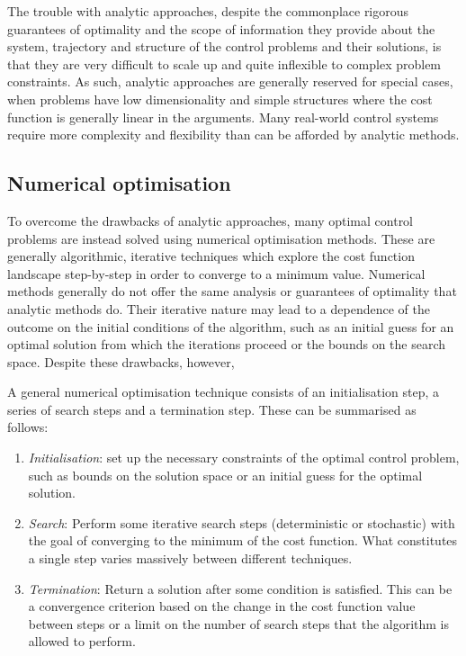 The trouble with analytic approaches, despite the commonplace rigorous guarantees of optimality and the scope of information they provide about the system, trajectory and structure of the control problems and their solutions, is that they are very difficult to scale up and quite inflexible to complex problem constraints. As such, analytic approaches are generally reserved for special cases, when problems have low dimensionality and simple structures where the cost function is generally linear in the arguments. Many real-world control systems require more complexity and flexibility than can be afforded by analytic methods.

\subsection{Numerical optimisation} 

To overcome the drawbacks of analytic approaches, many optimal control problems are instead solved using numerical optimisation methods. These are generally algorithmic, iterative  techniques which explore the cost function landscape step-by-step in order to converge to a minimum value. Numerical methods generally do not offer the same analysis or guarantees of optimality that analytic methods do. Their iterative nature may lead to a dependence of the outcome on the initial conditions of the algorithm, such as an initial guess for an optimal solution from which the iterations proceed or the bounds on the search space. Despite these drawbacks, however, 

A general numerical optimisation technique consists of an initialisation step, a series of search steps and a termination step. These can be summarised as follows:
\begin{enumerate}
    \item \emph{Initialisation}: set up the necessary constraints of the optimal control problem, such as bounds on the solution space or an initial guess for the optimal solution.
    \item \emph{Search}: Perform some iterative search steps (deterministic or stochastic) with the goal of converging to the minimum of the cost function. What constitutes a single step varies massively between different techniques.
    \item \emph{Termination}: Return a solution after some condition is satisfied. This can be a convergence criterion based on the change in the cost function value between steps or a limit on the number of search steps that the algorithm is allowed to perform.
\end{enumerate}

